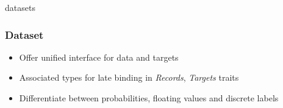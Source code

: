 \documentclass[xcolor=x11names,compress]{beamer}
\begin{document}
\begin{frame}{datasets}
    \frametitle{Dataset}

    \begin{itemize}
        \item<1-> Offer unified interface for data and targets
        \item<2-> Associated types for late binding in \textit{Records}, \textit{Targets} traits
        \item<3-> Differentiate between probabilities, floating values and discrete labels 
    \end{itemize}

\end{frame}
\end{document}
